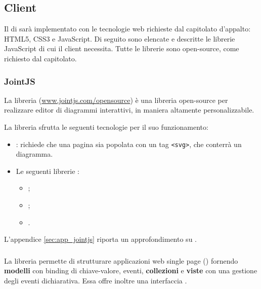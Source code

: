 


\subsection{Client} \label{sec:tech_client}
Il  di \proj{} sarà implementato con le tecnologie web richieste dal capitolato d'appalto: HTML5, CSS3 e JavaScript. Di seguito sono elencate e descritte le librerie JavaScript di cui il client necessita. Tutte le librerie sono open-source, come richiesto dal capitolato.


\subsubsection{JointJS}
La libreria \jointjs{} (\url{www.jointjs.com/opensource}) è una libreria open-source per realizzare editor di diagrammi interattivi, in maniera altamente personalizzabile.

La libreria sfrutta le seguenti tecnologie per il suo funzionamento:
\begin{itemize}
	\item \html: \jointjs{} richiede che una pagina \html{} sia popolata con un tag \texttt{<svg>}, che conterrà un diagramma.
	\item Le seguenti librerie \js:
	\begin{itemize}
		\item \jquery;
		\item \lodash;
		\item \backbonejs.
	\end{itemize}
\end{itemize}


L'appendice \ref{sec:app_jointjs} riporta un approfondimento su \jointjs.

\subsubsection{\backbonejs}
La libreria \backbonejs{} permette di strutturare applicazioni web single page () fornendo \textbf{modelli} con binding di chiave-valore, eventi, \textbf{collezioni} e \textbf{viste} con una gestione degli eventi dichiarativa. Essa offre inoltre una interfaccia .

